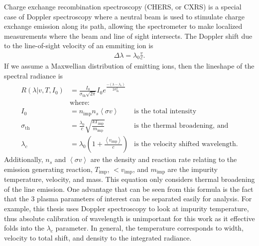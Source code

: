 Charge exchange recombination spectroscopy (CHERS, or CXRS) is a special case of Doppler spectroscopy where a neutral beam is used to stimulate charge exchange emission along its path, allowing the spectrometer to make localized measurements where the beam and line of sight intersects. The Doppler shift due to the line-of-sight velocity of an emmiting ion is 
\begin{align}
    \Delta\lambda = \lambda_0 \frac{v}{c}.
\end{align}
If we assume a Maxwellian distribution of emitting ions, then the lineshape of the spectral radiance is 
\begin{align}
    R(\lambda | v, T, I_0) &= \frac{I_0}{\sigma_\text{th} \sqrt{2\pi}}I_0 e^{\frac{-(\lambda-\lambda_c)}{2\sigma_\text{th}^2}}\\
    &\text{where:}\\
    I_0 &= n_{\text{imp}}n_s \left< \sigma v \right> &\text{is the total intensity}\\
    \sigma_\text{th} &= \frac{\lambda_0}{c}\sqrt{\frac{kT_\text{imp}}{m_{\text{imp}}}} &\text{is the thermal broadening, and}\\
    \lambda_c &= \lambda_0(1+\frac{\left< v_\text{imp} \right>}{c}) &\text{is the velocity shifted wavelength.}
\end{align}
Additionally, $n_s$ and $\left<\sigma v\right>$ are the density and reaction rate relating to the emission generating reaction, $T_\text{imp}$, $<v_\text{imp}$, and $m_\text{imp}$ are the impurity temperature, velocity, and mass. This equation only considers thermal broadening of the line emission. One advantage that can be seen from this formula is the fact that the 3 plasma parameters of interest can be separated easily for analysis. For example, this thesis uses Doppler spectroscopy to look at impurity temperature, thus absolute calibration of wavelength is unimportant for this work as it effective folds into the $\lambda_c$ parameter. In general, the temperature corresponds to width, velocity to total shift, and density to the integrated radiance. 

